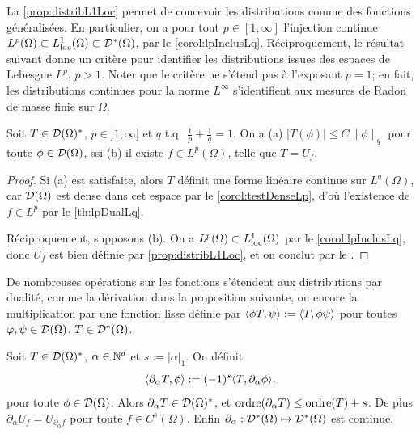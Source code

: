 La \cref{prop:distribL1Loc} permet de concevoir les distributions comme des fonctions généralisées.
En particulier, on a pour tout $p \in [1,\infty]$ l'injection continue $L^p(\Omega)\subset L^1_{\mathrm{loc}}(\Omega) \subset \mathcal{D}^*(\Omega)$, par le \cref{corol:lpInclusLq}. Réciproquement, le résultat suivant donne un critère pour identifier les distributions issues des espaces de Lebesgue $L^p$, $p>1$. Noter que le critère ne s'étend pas à l'exposant $p=1$; en fait, les distributions continues pour la norme $L^\infty$ s'identifient aux mesures de Radon de masse finie sur $\Omega$.

\begin{corollary}
\label{corol:distribLp}
%
Soit $T \in \mathcal{D}(\Omega)^*$, $p\in ]1,\infty]$ et $q$ t.q.\ $\frac 1 p + \frac 1 q = 1$. On a (a) $|T(\phi)| \leq C\|\phi\|_q$ pour toute $\phi \in \mathcal{D}(\Omega)$, ssi (b) il existe $f \in L^p(\Omega)$, telle que $T = U_f$. 
\end{corollary}

\begin{proof} 
Si (a) est satisfaite, alors $T$ définit une forme linéaire continue sur $L^q(\Omega)$, car $\mathcal{D}(\Omega)$ est dense dans cet espace par le \cref{corol:testDenseLp}, d'où l'existence de $f\in L^p$ par le \cref{th:lpDualLq}.

Réciproquement, supposons (b). On a $L^p(\Omega) \subset L^1_{\mathrm{loc}}(\Omega)$ par le \cref{corol:lpInclusLq}, donc $U_f$ est bien définie par \cref{prop:distribL1Loc}, et on conclut par le .
\end{proof}

 De nombreuses opérations sur les fonctions s'étendent aux distributions par dualité, comme la dérivation dans la proposition suivante, ou encore la multiplication par une fonction lisse définie par $\langle\phi T,\psi\rangle := \langle T, \phi \psi\rangle$ pour toutes $\varphi,\psi \in \mathcal{D}(\Omega)$, $T \in \mathcal{D}^*(\Omega)$.

\begin{proposition}
\label{prop:deriv_distrib}
%
Soit $T \in \mathcal{D}(\Omega)^*$, $\alpha \in \mathbb{N}^d$ et $s:=|\alpha|_1$. On définit
\begin{equation*}
	\<\partial_\alpha T, \phi\> := (-1)^s \<T,\partial_\alpha \phi\>, %
\end{equation*}
pour toute $\phi \in \mathcal{D}(\Omega)$. Alors $\partial_\alpha T \in \mathcal{D}(\Omega)^*$, et $\operatorname{ordre}(\partial_\alpha T) \leq \operatorname{ordre}(T) + s$. De plus $\partial_\alpha U_f = U_{\partial_\alpha f}$ pour toute $f \in C^s(\Omega)$. Enfin $\partial_\alpha : \mathcal{D}^*(\Omega) \mapsto \mathcal{D}^*(\Omega)$ est continue.
\end{proposition}

